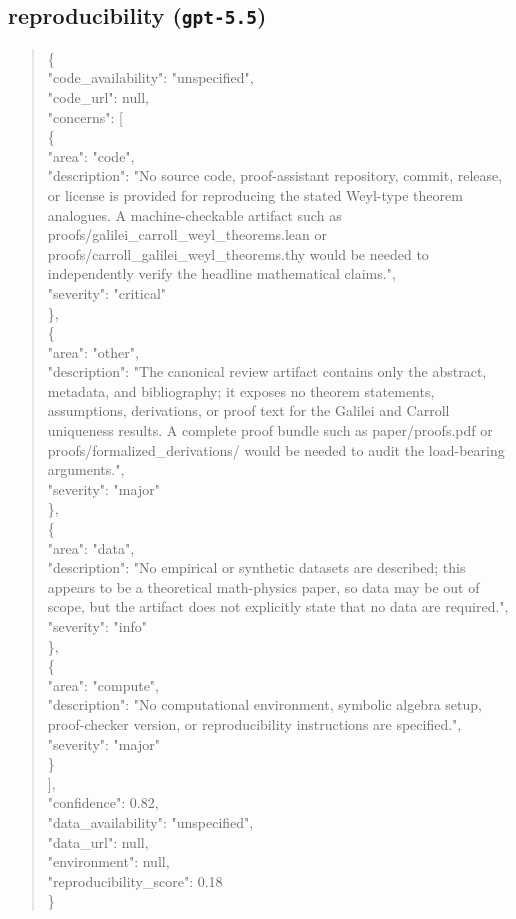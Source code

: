 \documentclass[11pt]{article}
\begin{document}
\subsection*{reproducibility (\texttt{gpt-5.5})}
\begin{quote}\small\ttfamily\raggedright
\{\\
  "code\_availability": "unspecified",\\
  "code\_url": null,\\
  "concerns": [\\
    \{\\
      "area": "code",\\
      "description": "No source code, proof-assistant repository, commit, release, or license is provided for reproducing the stated Weyl-type theorem analogues. A machine-checkable artifact such as proofs/galilei\_carroll\_weyl\_theorems.lean or proofs/carroll\_galilei\_weyl\_theorems.thy would be needed to independently verify the headline mathematical claims.",\\
      "severity": "critical"\\
    \},\\
    \{\\
      "area": "other",\\
      "description": "The canonical review artifact contains only the abstract, metadata, and bibliography; it exposes no theorem statements, assumptions, derivations, or proof text for the Galilei and Carroll uniqueness results. A complete proof bundle such as paper/proofs.pdf or proofs/formalized\_derivations/ would be needed to audit the load-bearing arguments.",\\
      "severity": "major"\\
    \},\\
    \{\\
      "area": "data",\\
      "description": "No empirical or synthetic datasets are described; this appears to be a theoretical math-physics paper, so data may be out of scope, but the artifact does not explicitly state that no data are required.",\\
      "severity": "info"\\
    \},\\
    \{\\
      "area": "compute",\\
      "description": "No computational environment, symbolic algebra setup, proof-checker version, or reproducibility instructions are specified.",\\
      "severity": "major"\\
    \}\\
  ],\\
  "confidence": 0.82,\\
  "data\_availability": "unspecified",\\
  "data\_url": null,\\
  "environment": null,\\
  "reproducibility\_score": 0.18\\
\}\\
\end{quote}
\end{document}
